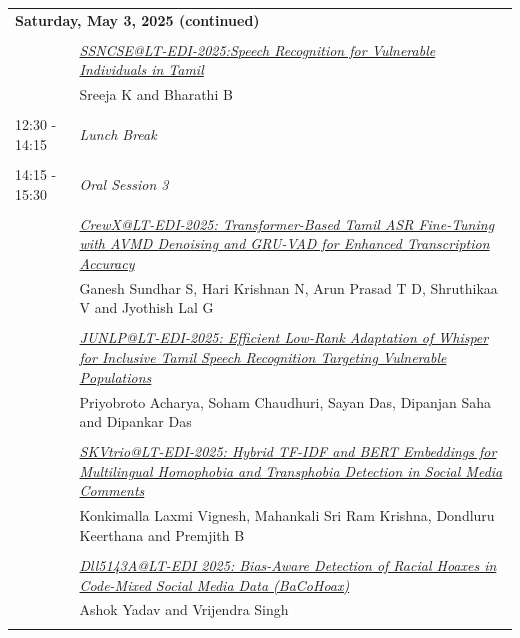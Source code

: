 \documentclass[11pt,oneside]{book}
\begin{document}
    \newpage
          \begin{tabular}{p{24mm}p{124mm}}
    \multicolumn{2}{l}{\bf Saturday, May 3, 2025 (continued)} \\\\
          
                      & \hyperlink{page.6}{\emph{SSNCSE@LT-EDI-2025:Speech Recognition for Vulnerable Individuals in Tamil}}\\
        & Sreeja K\index{K} and Bharathi B\index{B}\\\\
                      12:30 - 14:15 & \emph{Lunch Break}\\\\
      
                      14:15 - 15:30 & \emph{Oral Session 3}\\\\
      
                
                      & \hyperlink{page.11}{\emph{CrewX@LT-EDI-2025: Transformer-Based Tamil ASR Fine-Tuning with AVMD Denoising and GRU-VAD for Enhanced Transcription Accuracy}}\\
        & Ganesh Sundhar S\index{S}, Hari Krishnan N\index{N}, Arun Prasad T D\index{D}, Shruthikaa V\index{V} and Jyothish Lal G\index{G}\\\\
                
                      & \hyperlink{page.17}{\emph{JUNLP@LT-EDI-2025: Efficient Low-Rank Adaptation of Whisper for Inclusive Tamil Speech Recognition Targeting Vulnerable Populations}}\\
        & Priyobroto Acharya\index{Acharya}, Soham Chaudhuri\index{Chaudhuri}, Sayan Das\index{Das}, Dipanjan Saha\index{Saha} and Dipankar Das\index{Das}\\\\
                
                      & \hyperlink{page.26}{\emph{SKVtrio@LT-EDI-2025: Hybrid TF-IDF and BERT Embeddings for  Multilingual Homophobia and Transphobia Detection in Social Media  Comments}}\\
        & Konkimalla Laxmi Vignesh\index{Vignesh}, Mahankali Sri Ram Krishna\index{Krishna}, Dondluru Keerthana\index{Keerthana} and Premjith B\index{B}\\\\
                
                      & \hyperlink{page.31}{\emph{Dll5143A@LT-EDI 2025: Bias-Aware Detection of Racial Hoaxes in Code-Mixed Social Media Data (BaCoHoax)}}\\
        & Ashok Yadav\index{Yadav} and Vrijendra Singh\index{Singh}\\\\
                

\end{tabular}
\end{document}
